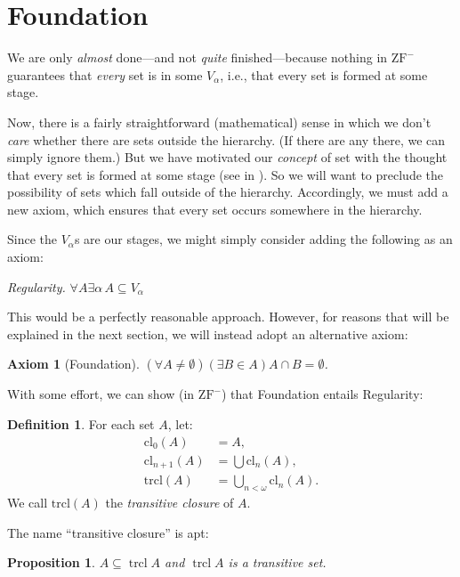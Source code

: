 \documentclass[10pt,a4paper]{article}
\makeatletter
\theoremstyle{plain}
\newtheorem{prop}[thm]{Proposition}
\newtheorem{axiom}{Axiom}
\theoremstyle{definition}
\newtheorem{defn}[thm]{Definition}
\theoremstyle{remark}
\newcommand*{\olfileid}[3]{}
\newcommand*{\olsection}[1]{\section*{#1}}
\newcommand*{\ollabel}[1]{\label{#1}}
\newcommand{\olref}{\@ifnextchar[{\olref@i}{\olref@final}}
\def\olref@i[#1]{\@ifnextchar[{\olref@ii}{\olref@final}}
\def\olref@ii[#1]{\@ifnextchar[{\olref@iii}{\olref@final}}
\def\olref@iii[#1]{\olref@final}
\def\olref@final#1{\ref{#1}}
\providecommand{\trcl}{\operatorname{trcl}}
\providecommand{\ZFminus}{\mathrm{ZF}^{-}}
\makeatother
\begin{document}


\olfileid{sth}{spine}{foundation}

\olsection{Foundation}

We are only \emph{almost} done---and not \emph{quite} finished---because nothing in
$\ZFminus$ guarantees that \emph{every} set is in some $V_\alpha$,
i.e., that every set is formed at some stage. 

Now, there is a fairly straightforward (mathematical) sense in which
we don't \emph{care} whether there are sets outside the hierarchy. (If
there are any there, we can simply ignore them.) But we have motivated
our \emph{concept} of set with the thought that every set is formed at
some stage (see \stageshier{} in \olref[z][story]{sec}). So
we will want to preclude the possibility of sets which fall outside of
the hierarchy. Accordingly, we must add a new axiom, which ensures
that every set occurs somewhere in the hierarchy. 

Since the $V_\alpha$s are our stages, we might simply consider adding
the following as an axiom:

\begin{defish}
\emph{Regularity.} $\forall A \exists \alpha\, A \subseteq V_\alpha$
\end{defish}

This would be a perfectly reasonable approach. However, for reasons
that will be explained in the next section, we will instead adopt an
alternative axiom:

\begin{axiom}[Foundation]
$(\forall A \neq \emptyset)(\exists B \in A)A \cap B = \emptyset$.
\end{axiom}

With some effort, we can show (in $\ZFminus$) that Foundation entails Regularity:
\begin{defn}
For each set $A$, let:
\begin{align*}
	\text{cl}_0(A) &= A,\\
	\text{cl}_{n+1}(A) &= \bigcup \text{cl}_n(A),\\
	\text{trcl}(A) &= \bigcup_{n < \omega} \text{cl}_{n}(A).
\end{align*}
We call $\text{trcl}(A)$ the \emph{transitive closure} of $A$.
\end{defn}
\noindent
The name ``transitive closure'' is apt:
\begin{prop}\ollabel{subsetoftrcl}
$A \subseteq \trcl{A}$ and $\trcl{A}$ is a transitive set. 
\end{prop}
\end{document}
